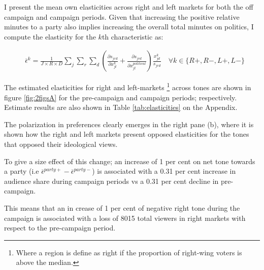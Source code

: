 \documentclass[12pt]{article}
\begin{document}
	I present the mean own elasticities across right and left markets for both the off campaign and campaign periods.  Given that increasing the positive relative minutes to a party also implies increasing the overall total minutes on politics, I compute the elasticity for the $k$th characteristic as: 
	
	\begin{equation}\label{eq:elasticities}
		\begin{aligned}
			& \bar{\epsilon}^k= \frac{1}{J\times R \times D}\sum_{j}\sum_{r} \sum_{d} \left(\frac{\partial s_{jrd}}{\partial x_{jt}^k} +  \frac{\partial s_{jrd}}{\partial x_{jt}^{political}} \right) \frac{x_{jd}^k}{s_{jrd}}    \quad \forall k \in \{R+,R-,L+,L-\}
		\end{aligned}
	\end{equation}             
	
	
The estimated elasticities for right and left-markets \footnote{Where a region is define as right if the proportion of right-wing voters is above the median. } across tones are shown in figure \ref{fig:2figsA} for the pre-campaign and campaign periods; respectively. Estimate results are also shown in Table \ref{tab:elasticities} on the Appendix. 

The polarization in preferences clearly emerges in the right pane (b), where it is shown how the right and left markets present opposed elasticities for the tones that opposed their ideological views. 

To give a size effect of this change; an increase of 1 per cent on net tone towards a party (i.e $ \bar{\epsilon}^{party+}- \bar{\epsilon}^{party-}$) is associated with a 0.31 per cent increase in audience share during campaign periods vs a 0.31 per cent decline in pre-campaign.

This means that an in crease of 1 per cent of negative right tone during the campaign is associated with a loss of 8015 total viewers in right markets with respect to the pre-campaign period. 
\end{document}
